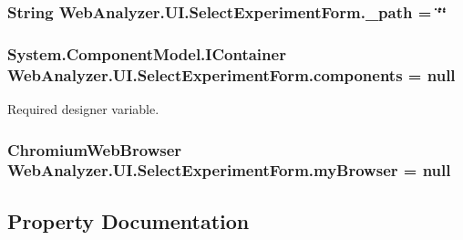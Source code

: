 \subsubsection[{\+\_\+path}]{\setlength{\rightskip}{0pt plus 5cm}String Web\+Analyzer.\+U\+I.\+Select\+Experiment\+Form.\+\_\+path = \char`\"{}\char`\"{}\hspace{0.3cm}{\ttfamily [private]}}\label{class_web_analyzer_1_1_u_i_1_1_select_experiment_form_ad9a2980f8398395b4f89587c3afb7208}
\hypertarget{class_web_analyzer_1_1_u_i_1_1_select_experiment_form_affbba5309ebe923f381276cde70ddea2}{}
\subsubsection[{components}]{\setlength{\rightskip}{0pt plus 5cm}System.\+Component\+Model.\+I\+Container Web\+Analyzer.\+U\+I.\+Select\+Experiment\+Form.\+components = null\hspace{0.3cm}{\ttfamily [private]}}\label{class_web_analyzer_1_1_u_i_1_1_select_experiment_form_affbba5309ebe923f381276cde70ddea2}


Required designer variable. 

\hypertarget{class_web_analyzer_1_1_u_i_1_1_select_experiment_form_a615aef1abb40fd49736731d1bb104ce3}{}
\subsubsection[{my\+Browser}]{\setlength{\rightskip}{0pt plus 5cm}Chromium\+Web\+Browser Web\+Analyzer.\+U\+I.\+Select\+Experiment\+Form.\+my\+Browser = null\hspace{0.3cm}{\ttfamily [private]}}\label{class_web_analyzer_1_1_u_i_1_1_select_experiment_form_a615aef1abb40fd49736731d1bb104ce3}


\subsection{Property Documentation}
\hypertarget{class_web_analyzer_1_1_u_i_1_1_select_experiment_form_ad5b8d4def72474dd55f8d244955bae36}{}
